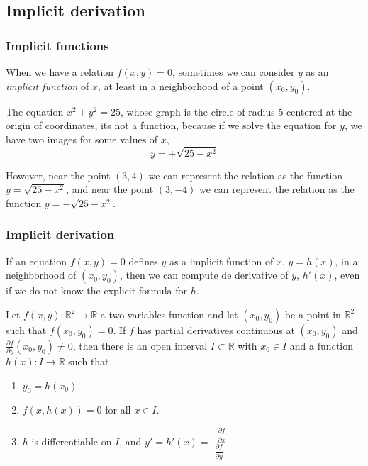 \subsection{Implicit derivation}
\begin{frame}
\frametitle{Implicit functions}
When we have a relation $f(x,y)=0$, sometimes we can consider $y$ as an \emph{implicit function} of $x$, at least in a neighborhood of a point $(x_0,y_0)$.

The equation $x^2+y^2=25$, whose graph is the circle of radius 5 centered at the origin of coordinates, its not a function, because if we solve the equation for $y$, we have two images for some values of $x$,
\[
y=\pm \sqrt{25-x^2}
\]

However, near the point $(3,4)$ we can represent the relation as the function $y=\sqrt{25-x^2}$, and near the point $(3,-4)$ we can represent the relation as the function $y=-\sqrt{25-x^2}$.
\end{frame}


\begin{frame}
\frametitle{Implicit derivation}
If an equation $f(x,y)=0$ defines $y$ as a implicit function of $x$, $y=h(x)$, in a neighborhood of $(x_0,y_0)$, then
we can compute de derivative of $y$, $h'(x)$, even if we do not know the explicit formula for $h$.

\begin{theorem}
Let $f(x,y):\mathbb{R}^2\longrightarrow \mathbb{R}$ a two-variables function and let $(x_0,y_0)$ be a point in $\mathbb{R}^2$ such that $f(x_0,y_0)=0$.
If $f$ has partial derivatives continuous at $(x_0,y_0)$ and $\frac{\partial f}{\partial y}(x_0,y_0)\neq 0$, then there is an open interval $I\subset \mathbb{R}$ with $x_0\in I$ and a function $h(x): I\longrightarrow \mathbb{R}$ such that
\begin{enumerate}
\item $y_0=h(x_0)$.
\item $f(x,h(x))=0$ for all $x\in I$.
\item $h$ is differentiable on $I$, and $y'=h'(x)=\frac{-\dfrac{\partial f}{\partial x}}{\dfrac{\partial f}{\partial y}}$
\end{enumerate}
\end{theorem}
\end{frame}


